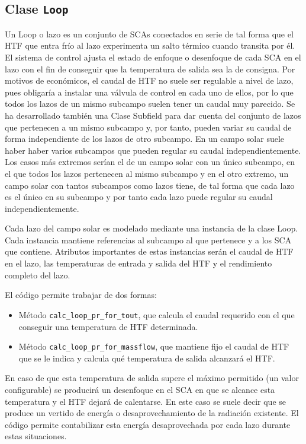 \subsection{Clase \texttt{Loop}}
\label{loop}

Un Loop o lazo es un conjunto de SCAs conectados en serie de tal forma que el HTF que entra frío al lazo experimenta un salto térmico cuando transita por él. El sistema de control ajusta el estado de enfoque o desenfoque de cada SCA en el lazo con el fin de conseguir que la temperatura de salida sea la de consigna. Por motivos de económicos, el caudal de HTF no suele ser regulable a nivel de lazo, pues obligaría a instalar una válvula de control en cada uno de ellos, por lo que todos los lazos de un mismo subcampo suelen tener un caudal muy parecido. Se ha desarrollado también una Clase Subfield para dar cuenta del conjunto de lazos que pertenecen a un mismo subcampo y, por tanto, pueden variar su caudal de forma independiente de los lazos de otro subcampo. En un campo solar suele haber haber varios subcampos que pueden regular su caudal independientemente. Los casos más extremos serían el de un campo solar con un único subcampo, en el que todos los lazos pertenecen al mismo subcampo y en el otro extremo, un campo solar con tantos subcampos como lazos tiene, de tal forma que cada lazo es el único en su subcampo y por tanto cada lazo puede regular su caudal independientemente. 

Cada lazo del campo solar es modelado mediante una instancia de la clase Loop. Cada instancia mantiene referencias al subcampo al que pertenece y a los SCA que contiene. Atributos importantes de estas instancias serán el caudal de HTF en el lazo, las temperaturas de entrada y salida del HTF y el rendimiento completo del lazo. 

El código permite trabajar de dos formas: 

\begin{itemize}
\item
Método \texttt{calc\_loop\_pr\_for\_tout}, que calcula el caudal requerido con el que conseguir una temperatura de HTF determinada.
\item
Método \texttt{calc\_loop\_pr\_for\_massflow}, que  mantiene fijo el caudal de HTF que se le indica y calcula qué temperatura de salida alcanzará el HTF. 
\end{itemize}

En caso de que esta temperatura de salida supere el máximo permitido (un valor configurable) se producirá un desenfoque en el SCA en que se alcance esta temperatura y el HTF dejará de calentarse. En este caso se suele decir que se produce un vertido de energía o desaprovechamiento de la radiación existente. El código permite contabilizar esta energía desaprovechada por cada lazo durante estas situaciones.

